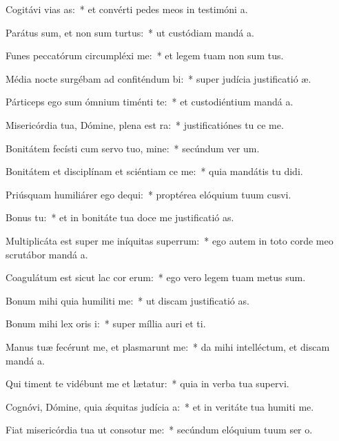 \item Cogitávi vias as:~* et convérti pedes meos in testimóni a.
\item Parátus sum, et non sum turtus:~* ut custódiam mandá a.
\item Funes peccatórum circumpléxi  me:~* et legem tuam non sum tus.
\item Média nocte surgébam ad confiténdum bi:~* super judícia justificatió æ.
\item Párticeps ego sum ómnium timénti te:~* et custodiéntium mandá a.
\item Misericórdia tua, Dómine, plena est ra:~* justificatiónes tu ce me.
\item Bonitátem fecísti cum servo tuo, mine:~* secúndum ver um.
\item Bonitátem et disciplínam et sciéntiam ce me:~* quia mandátis tu didi.
\item Priúsquam humiliárer ego dequi:~* proptérea elóquium tuum cusvi.
\item Bonus  tu:~* et in bonitáte tua doce me justificatió as.
\item Multiplicáta est super me iníquitas superrum:~* ego autem in toto corde meo scrutábor mandá a.
\item Coagulátum est sicut lac cor erum:~* ego vero legem tuam metus sum.
\item Bonum mihi quia humiliti me:~* ut discam justificatió as.
\item Bonum mihi lex oris i:~* super míllia auri et ti.
\item Manus tuæ fecérunt me, et plasmarunt me:~* da mihi intelléctum, et discam mandá a.
\item Qui timent te vidébunt me et lætatur:~* quia in verba tua supervi.
\item Cognóvi, Dómine, quia ǽquitas judícia a:~* et in veritáte tua humiti me.
\item Fiat misericórdia tua ut consotur me:~* secúndum elóquium tuum ser o.
